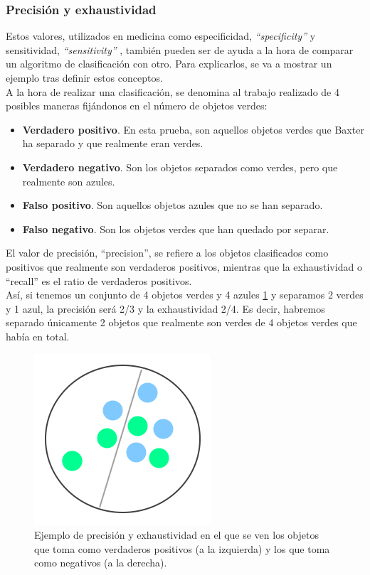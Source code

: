 \subsubsection{Precisión y exhaustividad}
\noindent Estos valores, utilizados en medicina como especificidad, \textit{``specificity''} y sensitividad, \textit{``sensitivity''} \cite{powers2011evaluation}, también pueden ser de ayuda a la hora de comparar un algoritmo de clasificación con otro. Para explicarlos, se va a mostrar un ejemplo tras definir estos conceptos.  \cite{pr} \\

\noindent A la hora de realizar una clasificación, se denomina al trabajo realizado de 4 posibles maneras fijándonos en el número de objetos verdes: \\

\begin{itemize}
	\item \textbf{Verdadero positivo}. En esta prueba, son aquellos objetos verdes que Baxter ha separado y que realmente eran verdes.
	\item \textbf{Verdadero negativo}. Son los objetos separados como verdes, pero que realmente son azules.
	\item \textbf{Falso positivo}. Son aquellos objetos azules que no se han separado.
	\item \textbf{Falso negativo}. Son los objetos verdes que han quedado por separar. \\
\end{itemize}

\noindent El valor de precisión, ``precision'', se refiere a los objetos clasificados como positivos que realmente son verdaderos positivos, mientras que la exhaustividad o ``recall'' es el ratio de verdaderos positivos. \\
\noindent Así, si tenemos un conjunto de 4 objetos verdes y 4 azules \ref{cd:clasif} y separamos 2 verdes y 1 azul, la precisión será 2/3 y la exhaustividad 2/4. Es decir, habremos separado únicamente 2 objetos que realmente son verdes de 4 objetos verdes que había en total. \\

\begin{figure}[H]
	\centering
	\label{cd:clasif}
	\includegraphics[scale=0.55]{imagenes/clasif.png}
	\caption{Ejemplo de precisión y exhaustividad en el que se ven los objetos que toma como verdaderos positivos (a la izquierda) y los que toma como negativos (a la derecha).}
\end{figure}

